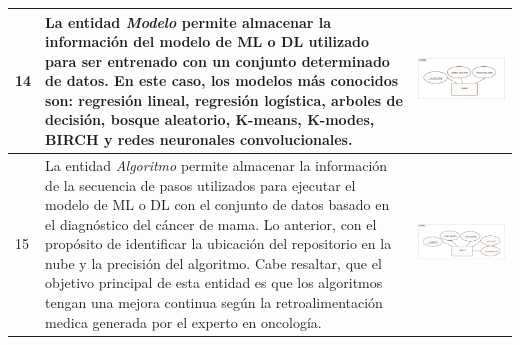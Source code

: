 \begin{table}[htb!]
\begin{threeparttable}
\begin{tabular}{p{0.5cm} p{7cm} p{7cm}}
			\\ \hline
			14
			& La entidad \textit{Modelo} permite almacenar la información del modelo de ML o DL utilizado para ser entrenado con un conjunto determinado de datos. En este caso, los modelos más conocidos son: regresión lineal, regresión logística, arboles de decisión, bosque aleatorio, K-means, K-modes, BIRCH y redes neuronales convolucionales.
			& \begin{center}\includegraphics[width=1\linewidth]{MER/IMAGENES_MER/14_MODELO}\end{center}
			\\ \hline
			15
			& La entidad \textit{Algoritmo} permite almacenar la información de la secuencia de pasos utilizados para ejecutar el modelo de ML o DL con el conjunto de datos basado en el diagnóstico del cáncer de mama. Lo anterior, con el propósito de identificar la ubicación del repositorio en la nube y la precisión del algoritmo. Cabe resaltar, que el objetivo principal de esta entidad es que los algoritmos tengan una mejora continua según la retroalimentación medica generada por el experto en oncología.
			& \begin{center}\includegraphics[width=1\linewidth]{MER/IMAGENES_MER/15_ALGORITMO}\end{center}
			\\ \hline
		\end{tabular}
	\end{threeparttable}
\end{table}
